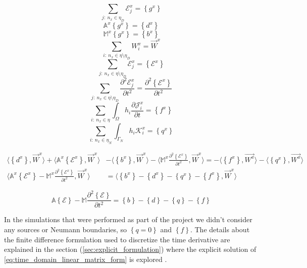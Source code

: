 $$\sum_{j:\ n_x \in \eta_D}\mathcal{E}_j^x = \left\lbrace g^x \right\rbrace $$
$$ \mathbb{A}^x\left\lbrace g^x \right\rbrace=\left\lbrace d^x \right\rbrace$$ 
$$\mathbb{M}^x\left\lbrace g^x \right\rbrace=\left\lbrace b^x \right\rbrace$$
$$\sum_{i:\ n_x \in \eta\setminus\eta_D}W_i^x = \vec{W}^x $$
$$\sum_{j:\ n_x \in\eta\setminus\eta_D}\mathcal{E}_j^x = \left\lbrace \mathcal{E}^x\right\rbrace $$
$$\sum_{j:\ n_x \in\eta\setminus\eta_D}\frac{\partial^2 \mathcal{E}_j^x}{\partial t^2} = \frac{\partial^2\left\lbrace \mathcal{E}^x\right\rbrace}{\partial t^2} $$
$$ \sum_{i:\ n_x \in \eta}\int_{\Omega} h_i\frac{\partial\mathcal{J}_i^x}{\partial t} = \left\lbrace f^x \right\rbrace $$
$$\sum_{i:\ n_x \in \eta_N}\int_{\Gamma_N} h_i\mathcal{K}_i^x = \left\lbrace q^x   \right\rbrace$$

\begin{align}
\langle\left\lbrace d^x \right\rbrace,\vec{W}^x\rangle
+\langle\mathbb{A}^x\left\lbrace\mathcal{E}^x \right\rbrace,\vec{W}^x\rangle&-\langle \left\lbrace b^x \right\rbrace,\vec{W}^x\rangle
-\langle\mathbb{M}^x \frac{\partial^2\left\lbrace\mathcal{E}^x \right\rbrace}{\partial t^2},\vec{W}^x\rangle = -\langle \left\lbrace f^x\right\rbrace, \vec{W^x}\rangle-\langle \left\lbrace q^x\right\rbrace, \vec{W^x}\rangle \nonumber\\
\langle\mathbb{A}^x\left\lbrace \mathcal{E}^x \right\rbrace- \mathbb{M}^x\frac{\partial^2\left\lbrace\mathcal{E}^x \right\rbrace}{\partial t^2},\vec{W}^x \rangle &=\langle \left\lbrace b^x \right\rbrace-\left\lbrace d^x \right\rbrace-\left\lbrace q^x   \right\rbrace-\left\lbrace f^x\right\rbrace , \vec{W}^x \rangle
\end{align}

\begin{equation}
\mathbb{A}\left\lbrace \mathcal{E} \right\rbrace- \mathbb{M}\frac{\partial^2\left\lbrace\mathcal{E} \right\rbrace}{\partial t^2} = \left\lbrace b \right\rbrace-\left\lbrace d \right\rbrace-\left\lbrace q   \right\rbrace-\left\lbrace f\right\rbrace
\label{eq:time_domain_linear_matrix_form}
\end{equation}

In the simulations that were performed as part of the project we didn't consider any sources or Neumann boundaries, so $\left\lbrace q=0\right\rbrace$ and $\left\lbrace f\right\rbrace$. The details about the finite difference formulation used to discretize the time derivative are explained in the section (\ref{sec:explicit_formulation}) where the explicit solution of \ref{eq:time_domain_linear_matrix_form} is explored .


